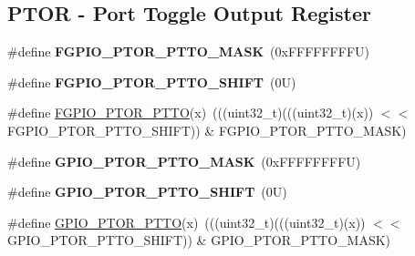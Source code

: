 \subsection*{P\+T\+OR -\/ Port Toggle Output Register}
\begin{DoxyCompactItemize}
\item 
\mbox{\label{group___f_g_p_i_o___register___masks_gab0e5427135589fc107fe4b465e5c767f}} 
\#define {\bfseries F\+G\+P\+I\+O\+\_\+\+P\+T\+O\+R\+\_\+\+P\+T\+T\+O\+\_\+\+M\+A\+SK}~(0x\+F\+F\+F\+F\+F\+F\+F\+F\+U)
\item 
\mbox{\label{group___f_g_p_i_o___register___masks_gae2127729a1021dc8d34d55a758102213}} 
\#define {\bfseries F\+G\+P\+I\+O\+\_\+\+P\+T\+O\+R\+\_\+\+P\+T\+T\+O\+\_\+\+S\+H\+I\+FT}~(0\+U)
\item 
\#define \mbox{\hyperlink{group___f_g_p_i_o___register___masks_gad88e5aa39295cd2c0d225f417f6c741a}{F\+G\+P\+I\+O\+\_\+\+P\+T\+O\+R\+\_\+\+P\+T\+TO}}(x)~(((uint32\+\_\+t)(((uint32\+\_\+t)(x)) $<$$<$ F\+G\+P\+I\+O\+\_\+\+P\+T\+O\+R\+\_\+\+P\+T\+T\+O\+\_\+\+S\+H\+I\+FT)) \& F\+G\+P\+I\+O\+\_\+\+P\+T\+O\+R\+\_\+\+P\+T\+T\+O\+\_\+\+M\+A\+SK)
\item 
\mbox{\label{group___f_g_p_i_o___register___masks_gaa75953b5d9d23bdaa6c24232e1a52680}} 
\#define {\bfseries G\+P\+I\+O\+\_\+\+P\+T\+O\+R\+\_\+\+P\+T\+T\+O\+\_\+\+M\+A\+SK}~(0x\+F\+F\+F\+F\+F\+F\+F\+F\+U)
\item 
\mbox{\label{group___f_g_p_i_o___register___masks_ga70e5442b3a119665aafb9e6e5b48bbd5}} 
\#define {\bfseries G\+P\+I\+O\+\_\+\+P\+T\+O\+R\+\_\+\+P\+T\+T\+O\+\_\+\+S\+H\+I\+FT}~(0\+U)
\item 
\#define \mbox{\hyperlink{group___f_g_p_i_o___register___masks_ga40757476c8889ca9d4cb7017b6c5ab60}{G\+P\+I\+O\+\_\+\+P\+T\+O\+R\+\_\+\+P\+T\+TO}}(x)~(((uint32\+\_\+t)(((uint32\+\_\+t)(x)) $<$$<$ G\+P\+I\+O\+\_\+\+P\+T\+O\+R\+\_\+\+P\+T\+T\+O\+\_\+\+S\+H\+I\+FT)) \& G\+P\+I\+O\+\_\+\+P\+T\+O\+R\+\_\+\+P\+T\+T\+O\+\_\+\+M\+A\+SK)
\end{DoxyCompactItemize}
